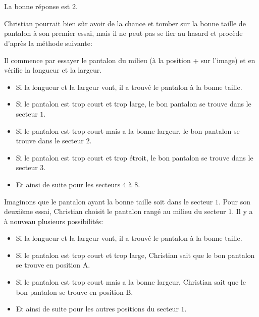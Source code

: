 {{%
\section*{\BrochureSolution}
La bonne réponse est $2$.

Christian pourrait bien sûr avoir de la chance et tomber sur la bonne taille de pantalon à son premier essai, mais il ne peut pas se fier au hasard et procède d’après la méthode suivante:

Il commence par essayer le pantalon du milieu (à la position + sur l’image) et en vérifie la longueur et la largeur.

\begin{itemize}
  \item Si la longueur et la largeur vont, il a trouvé le pantalon à la bonne taille.
  \item Si le pantalon est trop court et trop large, le bon pantalon se trouve dans le secteur $1$.
  \item Si le pantalon est trop court mais a la bonne largeur, le bon pantalon se trouve dans le secteur $2$.
  \item Si le pantalon est trop court et trop étroit, le bon pantalon se trouve dans le secteur $3$.
  \item Et ainsi de suite pour les secteurs $4$ à $8$.
\end{itemize}

{\centering%
\par}

Imaginons que le pantalon ayant la bonne taille soit dans le secteur $1$. Pour son deuxième essai, Christian choisit le pantalon rangé au milieu du secteur $1$. Il y a à nouveau plusieurs possibilités:

\begin{itemize}
  \item Si la longueur et la largeur vont, il a trouvé le pantalon à la bonne taille.
  \item Si le pantalon est trop court et trop large, Christian sait que le bon pantalon se trouve en position A.
  \item Si le pantalon est trop court mais a la bonne largeur, Christian sait que le bon pantalon se trouve en position B.
  \item Et ainsi de suite pour les autres positions du secteur $1$.
\end{itemize}

}}
